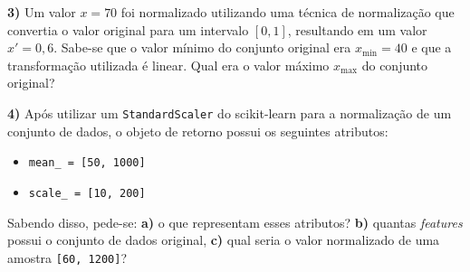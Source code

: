 \documentclass[a4paper,12pt]{article} %
\begin{document}
\noindent\textbf{3)} Um valor $x = 70$ foi normalizado utilizando uma técnica de normalização que convertia o valor original para um intervalo $[0,1]$, resultando em um valor $x' = 0{,}6$. Sabe-se que o valor mínimo do conjunto original era $x_{\min} = 40$ e que a transformação utilizada é linear. Qual era o valor máximo $x_{\max}$ do conjunto original?

\vspace{1.2cm}


\noindent\textbf{4)} Após utilizar um \texttt{StandardScaler} do scikit-learn para a normalização de um conjunto de dados, o objeto de retorno possui os seguintes atributos:
\begin{itemize}
    \item \texttt{mean\_ = [50, 1000]}
    \item \texttt{scale\_ = [10, 200]}
\end{itemize}

Sabendo disso, pede-se: \textbf{a)} o que representam esses atributos? \textbf{b)} quantas \textit{features} possui o conjunto de dados original, \textbf{c)} qual seria o valor normalizado de uma amostra \texttt{[60, 1200]}?
\end{document}
